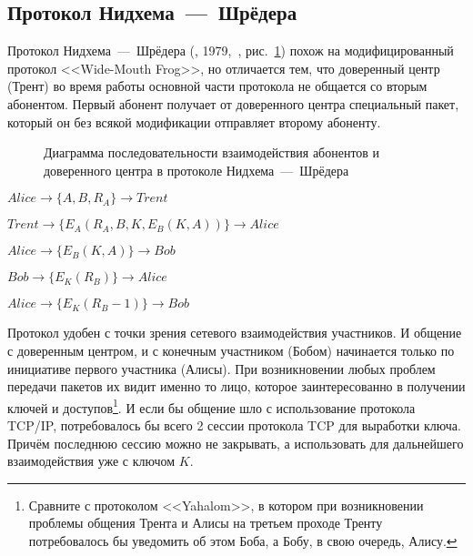 \subsection{Протокол Нидхема~---~Шрёдера}\label{section-protocols-needham-schroeder}

Протокол Нидхема~---~Шрёдера (, 1979,~\cite{Needham:Schroeder:1978}, рис.~\ref{fig:key_distribution-needham-schroeder}) похож на модифицированный протокол <<Wide-Mouth Frog>>, но отличается тем, что доверенный центр (Трент) во время работы основной части протокола не общается со вторым абонентом. Первый абонент получает от доверенного центра специальный пакет, который он без всякой модификации отправляет второму абоненту.

\begin{figure}[thb]
	\centering
	\begin{sequencediagram}

	\end{sequencediagram}
	\caption{Диаграмма последовательности взаимодействия абонентов и доверенного центра в протоколе Нидхема~---~Шрёдера\label{fig:key_distribution-needham-schroeder}}
\end{figure}

\begin{protocol}
	\item[(1)] $ Alice	\to \{ A, B, R_A \}						\to Trent $
	\item[(2)] $ Trent	\to \{ E_A \left( R_A, B, K, E_B \left( K, A \right) \right) \}	\to Alice $
	\item[(3)] $ Alice	\to \{ E_B \left( K, A \right) \}				\to Bob $
	\item[(4)] $ Bob	\to \{ E_K \left( R_B \right) \}				\to Alice $
	\item[(5)] $ Alice	\to \{ E_K \left( R_B - 1 \right) \}				\to Bob $
\end{protocol}

Протокол удобен с точки зрения сетевого взаимодействия участников. И общение с доверенным центром, и с конечным участником (Бобом) начинается только по инициативе первого участника (Алисы). При возникновении любых проблем передачи пакетов их видит именно то лицо, которое заинтересованно в получении ключей и доступов\footnote{Сравните с протоколом <<Yahalom>>, в котором при возникновении проблемы общения Трента и Алисы на третьем проходе Тренту потребовалось бы уведомить об этом Боба, а Бобу, в свою очередь, Алису.}. И если бы общение шло с использование протокола TCP/IP, потребовалось бы всего 2 сессии протокола TCP для выработки ключа. Причём последнюю сессию можно не закрывать, а использовать для дальнейшего взаимодействия уже с ключом $K$.

